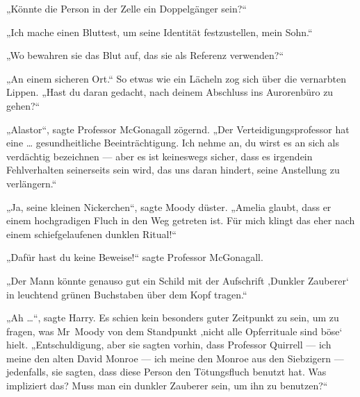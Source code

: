 „Könnte die Person in der Zelle ein Doppelgänger sein?“

„Ich mache einen Bluttest, um seine Identität festzustellen, mein Sohn.“

„Wo bewahren sie das Blut auf, das sie als Referenz verwenden?“

„An einem sicheren Ort.“ So etwas wie ein Lächeln zog sich über die vernarbten Lippen.
„Hast du daran gedacht, nach deinem Abschluss ins Aurorenbüro zu gehen?“

„Alastor“, sagte Professor McGonagall zögernd.
„Der Verteidigungsprofessor hat eine … gesundheitliche Beeinträchtigung. Ich nehme an, du wirst es an sich als verdächtig bezeichnen — aber es ist keineswegs sicher, dass es irgendein Fehlverhalten seinerseits sein wird, das uns daran hindert, seine Anstellung zu verlängern.“

„Ja, seine kleinen Nickerchen“, sagte Moody düster.
„Amelia glaubt, dass er einem hochgradigen Fluch in den Weg getreten ist. Für mich klingt das eher nach einem schiefgelaufenen dunklen Ritual!“

„Dafür hast du keine Beweise!“ sagte Professor McGonagall.

„Der Mann könnte genauso gut ein Schild mit der Aufschrift ‚Dunkler Zauberer‘ in leuchtend grünen Buchstaben über dem Kopf tragen.“

„Ah …“, sagte Harry. Es schien kein besonders guter Zeitpunkt zu sein, um zu fragen, was Mr~Moody von dem Standpunkt ‚nicht alle Opferrituale sind böse‘ hielt.
„Entschuldigung, aber sie sagten vorhin, dass Professor Quirrell — ich meine den alten David Monroe — ich meine den Monroe aus den Siebzigern — jedenfalls, sie sagten, dass diese Person den Tötungsfluch benutzt hat. Was impliziert das? Muss man ein dunkler Zauberer sein, um ihn zu benutzen?“

